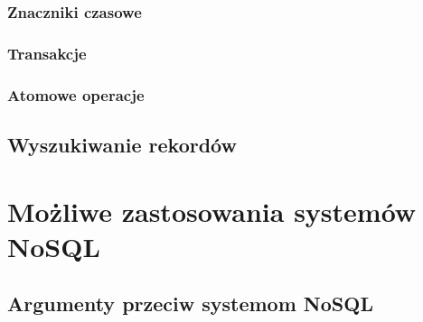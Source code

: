 \subsubsection*{Znaczniki czasowe}
\subsubsection*{Transakcje}
\subsubsection*{Atomowe operacje}

\subsection*{Wyszukiwanie rekordów}

\section{Możliwe zastosowania systemów NoSQL}

\subsection*{Argumenty przeciw systemom NoSQL}